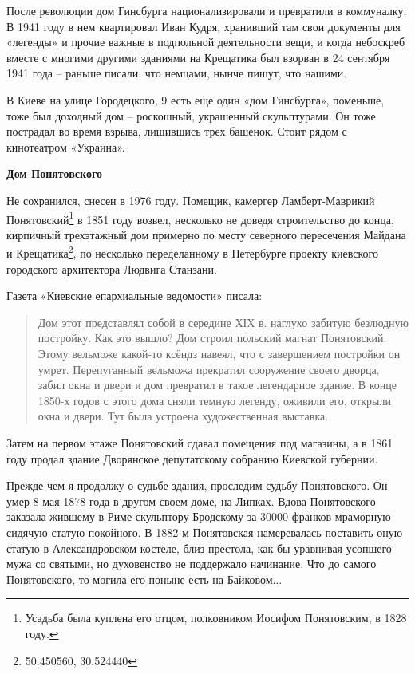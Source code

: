 После революции дом Гинсбурга национализировали и превратили в коммуналку. В 1941 году в нем квартировал Иван Кудря, хранивший там свои документы для «легенды» и прочие важные в подпольной деятельности вещи, и когда небоскреб вместе с многими другими зданиями на Крещатика был взорван в 24 сентября 1941 года – раньше писали, что немцами, нынче пишут, что нашими.
 
В Киеве на улице Городецкого, 9 есть еще один «дом Гинсбурга», поменьше, тоже был доходный дом – роскошный, украшенный скульптурами. Он тоже пострадал во время взрыва, лишившись трех башенок. Стоит рядом с кинотеатром «Украина».\\

\medskip


\textbf{Дом Понятовского}


Не сохранился, снесен в 1976 году. Помещик, камергер Ламберт-Маврикий Понятовский\footnote{Усадьба была куплена его отцом, полковником Иосифом Понятовским, в 1828 году.} в 1851 году возвел, несколько не доведя строительство до конца, кирпичный трехэтажный дом примерно по месту северного пересечения Майдана и Крещатика\footnote{50.450560, 30.524440}, по несколько переделанному в Петербурге проекту киевского городского архитектора Людвига Станзани.

Газета «Киевские епархиальные ведомости» писала:

\begin{quotation}
Дом этот представлял собой в середине ХІХ в. наглухо забитую безлюдную постройку. Как это вышло? Дом строил польский магнат Понятовский. Этому вельможе какой-то ксёндз навеял, что с завершением постройки он умрет. Перепуганный вельможа прекратил сооружение своего дворца, забил окна и двери и дом превратил в такое легендарное здание. В конце 1850-х годов с этого дома сняли темную легенду, оживили его, открыли окна и двери. Тут была устроена художественная выставка.\end{quotation}

Затем на первом этаже Понятовский сдавал помещения под магазины, а в 1861 году продал здание Дворянское депутатскому собранию Киевской губернии.

Прежде чем я продолжу о судьбе здания, проследим судьбу Понятовского. Он умер 8 мая 1878 года в другом своем доме, на Липках. Вдова Понятовского заказала жившему в Риме скульптору Бродскому за 30000 франков мраморную сидячую статую покойного. В 1882-м Понятовская намеревалась поставить оную статую в Александровском костеле, близ престола, как бы уравнивая усопшего мужа со святыми, но духовенство не поддержало начинание. Что до самого Понятовского, то могила его поныне есть на Байковом...


